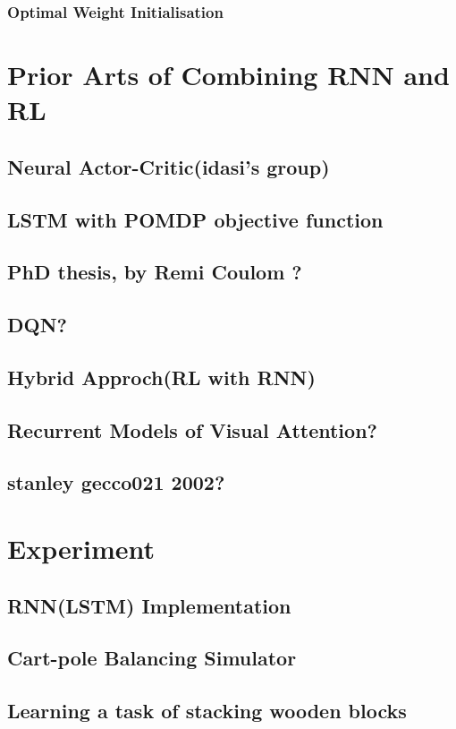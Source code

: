 \documentclass[officiallayout]{tktla}
\begin{document}
\subsection{Optimal Weight Initialisation}

\chapter{Prior Arts of Combining RNN and RL}
\section{Neural Actor-Critic(idasi's group)}
\section{LSTM with POMDP objective function}
\section{PhD thesis, by Remi Coulom ?}

\section{DQN?}
\section{Hybrid Approch(RL with RNN)}
\section{Recurrent Models of Visual Attention?}       
\section{stanley gecco021 2002?}
\chapter{Experiment}
\section{RNN(LSTM) Implementation}
\section{Cart-pole Balancing Simulator}
\section{Learning a task of stacking wooden blocks}
\end{document}

